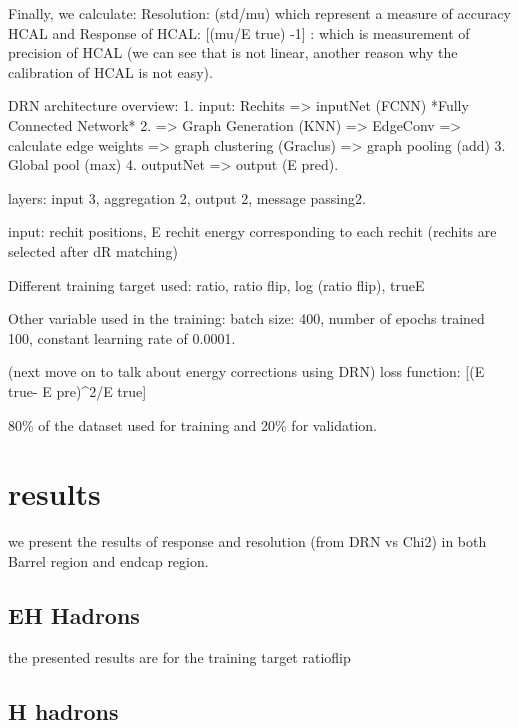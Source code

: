 Finally, we calculate: Resolution: (std/mu) which represent a measure of accuracy HCAL 
and Response of HCAL:  [(mu/E true) -1] : which is measurement of precision of HCAL 
(we can see that is not linear, another reason why the calibration of HCAL is not easy).

DRN architecture overview:
1. input: Rechits => inputNet (FCNN) *Fully Connected Network*
2. => Graph Generation (KNN) => EdgeConv => calculate edge weights => graph clustering (Graclus) => graph pooling (add)
3. Global pool (max) 4. outputNet => output (E pred).

layers: input 3, aggregation 2, output 2, message passing2.

input: rechit positions, E rechit energy corresponding to each rechit (rechits are selected after dR matching)

Different training target used: ratio, ratio flip, log (ratio flip), trueE

Other variable used in the training: batch size: 400, number of epochs trained 100, constant learning rate of 0.0001.

(next move on to talk about energy corrections using DRN) loss function:  [(E true- E pre)^2/E true]

80\% of the dataset used for training and 20\% for validation.

\section{results}
we present the results of response and resolution (from DRN vs Chi2) in  both Barrel region and endcap region.

\subsection{EH Hadrons}
the presented results are for the training target ratioflip





\subsection{H hadrons}




